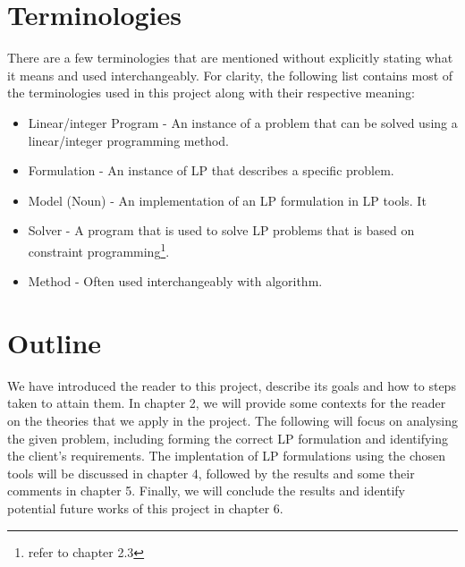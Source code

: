 \section{Terminologies}
There are a few terminologies that are mentioned without explicitly stating what it means and used interchangeably.
For clarity, the following list contains most of the terminologies used in this project along with their respective meaning:
\begin{itemize}
\item Linear/integer Program - An instance of a problem that can be solved using a linear/integer programming method.
\item Formulation - An instance of LP that describes a specific problem.
\item Model (Noun) - An implementation of an LP formulation in LP tools. It
\item Solver - A program that is used to solve LP problems that is based on constraint programming\footnote{refer to chapter 2.3}.
\item Method - Often used interchangeably with algorithm.
\end{itemize}

\section{Outline}
We have introduced the reader to this project, describe its goals and how to steps taken to attain them. In chapter 2,
we will provide some contexts for the reader on the theories that we apply in the project. The following will focus on
analysing the given problem, including forming the correct LP formulation and identifying the client's requirements.
The implentation of LP formulations using the chosen tools will be discussed in chapter 4, followed by the results and
some their comments in chapter 5. Finally, we will conclude the results and identify potential future works
of this project in chapter 6.